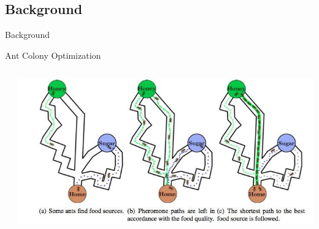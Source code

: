 \documentclass[aspectratio=169]{beamer}
\begin{document}
\subsection{Background}
\begin{frame}{Background}
\end{frame}
\begin{frame}{Ant Colony Optimization}
\begin{columns}
    \hspace{0.1cm}
    \begin{column}{0.25\textwidth}
        
    \end{column}
    
    \begin{column}{0.75\textwidth}  
    \begin{center}
    \includegraphics[scale=0.6]{img/The-concept-of-ant-colony-optimization.jpg}
    \end{center}
    \end{column}
\end{columns}
\end{frame}

%          
    
\end{document}
